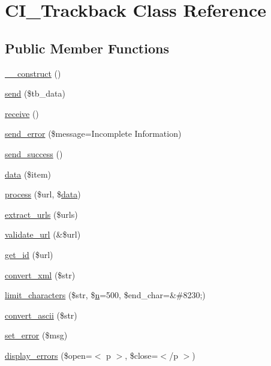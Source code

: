 \hypertarget{class_c_i___trackback}{}\section{C\+I\+\_\+\+Trackback Class Reference}
\label{class_c_i___trackback}
\subsection*{Public Member Functions}
\begin{DoxyCompactItemize}
\item 
\mbox{\hyperlink{class_c_i___trackback_a095c5d389db211932136b53f25f39685}{\+\_\+\+\_\+construct}} ()
\item 
\mbox{\hyperlink{class_c_i___trackback_a4ee54341ef16e67ca033704f4373a56b}{send}} (\$tb\+\_\+data)
\item 
\mbox{\hyperlink{class_c_i___trackback_ac805eb3a4eb25b19c1ab093023da4d35}{receive}} ()
\item 
\mbox{\hyperlink{class_c_i___trackback_a1d4188b1ba4d71ad5392bee635102e87}{send\+\_\+error}} (\$message=\textquotesingle{}Incomplete Information\textquotesingle{})
\item 
\mbox{\hyperlink{class_c_i___trackback_a57468453a4dc88340fdf12fb6e314248}{send\+\_\+success}} ()
\item 
\mbox{\hyperlink{class_c_i___trackback_a4d04a7a984a4bcc71e27be87706f393c}{data}} (\$item)
\item 
\mbox{\hyperlink{class_c_i___trackback_a7244ffd64e186d863812bb300fec8cdc}{process}} (\$url, \$\mbox{\hyperlink{class_c_i___trackback_a4d04a7a984a4bcc71e27be87706f393c}{data}})
\item 
\mbox{\hyperlink{class_c_i___trackback_aab29f333201544b83e318dd761ac797a}{extract\+\_\+urls}} (\$urls)
\item 
\mbox{\hyperlink{class_c_i___trackback_a5caa264fab6d2b2344e6bd5b298b08f2}{validate\+\_\+url}} (\&\$url)
\item 
\mbox{\hyperlink{class_c_i___trackback_a404e345e61e00d5685117a101b5bc71a}{get\+\_\+id}} (\$url)
\item 
\mbox{\hyperlink{class_c_i___trackback_a1ec67af2037561b65ffe49b59727cb53}{convert\+\_\+xml}} (\$str)
\item 
\mbox{\hyperlink{class_c_i___trackback_a55f0b98881441e99d74c657c3b005f11}{limit\+\_\+characters}} (\$str, \$\mbox{\hyperlink{cli_2error__php_8php_a2e6b16bbc42094e4c51ade3c10afdcf1}{n}}=500, \$end\+\_\+char=\textquotesingle{}\&\#8230;\textquotesingle{})
\item 
\mbox{\hyperlink{class_c_i___trackback_a0029bda7d34a222a5bda4ac894c31ac1}{convert\+\_\+ascii}} (\$str)
\item 
\mbox{\hyperlink{class_c_i___trackback_a892f1ba7cba3731a3fc68f1f64e92610}{set\+\_\+error}} (\$msg)
\item 
\mbox{\hyperlink{class_c_i___trackback_a71a6f2e6d97ff5347257f101002bc903}{display\+\_\+errors}} (\$open=\textquotesingle{}$<$ p $>$\textquotesingle{}, \$close=\textquotesingle{}$<$/p $>$\textquotesingle{})
\end{DoxyCompactItemize}
